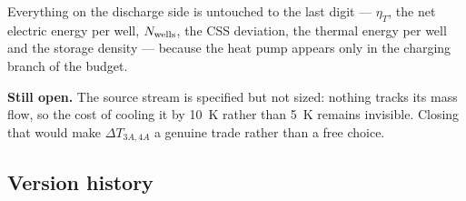 \noindent
Everything on the discharge side is untouched to the last digit --- $\eta_{T}$,
the net electric energy per well, $N_{\mathrm{wells}}$, the CSS deviation, the thermal
energy per well and the storage density --- because the heat pump appears only
in the charging branch of the budget.

\medskip
\noindent\textbf{Still open.} The source stream is specified but not sized:
nothing tracks its mass flow, so the cost of cooling it by \SI{10}{\kelvin}
rather than \SI{5}{\kelvin} remains invisible. Closing that would make
$\Delta T_{3A,4A}$ a genuine trade rather than a free choice.

\subsection{Version history}

